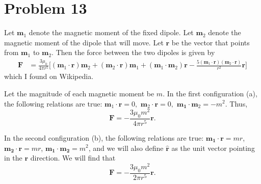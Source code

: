 \documentclass[12pt]{article}
\title{}
\date{}
\author{Jacob H. Nie}
\begin{document}
\section*{Problem 13}

Let $\mathbf{m}_1$ denote the magnetic moment of the fixed dipole.  Let $\mathbf{m}_2$ denote the magnetic moment of the dipole that will move.  Let $ \mathbf{r}$ be the vector that points from $\mathbf{m}_1$ to $\mathbf{m}_2$.  Then the force between the two dipoles is given by
\begin{align}
	\mathbf{F} &= \frac{3\mu_0}{4\pi r^{5}} \Big[ (\mathbf{m}_1 \cdot \mathbf{r})\mathbf{m}_2 + (\mathbf{m}_2 \cdot \mathbf{r})\mathbf{m}_1 + (\mathbf{m}_1\cdot \mathbf{m}_2)\mathbf{r} - \frac{5 (\mathbf{m}_1 \cdot \mathbf{r})(\mathbf{m}_2 \cdot \mathbf{r})}{r^2}\mathbf{r} \Big]
\end{align}
which I found on Wikipedia.  

Let the magnitude of each magnetic moment be $m$.  In the first configuration (a), the following relations are true: $\mathbf{m}_1 \cdot \mathbf{r} = 0,$ $\mathbf{m}_2 \cdot \mathbf{r} = 0,$ $\mathbf{m_1}\cdot \mathbf{m}_2 = -m^2$.  Thus,
\begin{equation}
	\mathbf{F} = -\frac{3\mu_0 m^2}{4\pi r^5} \mathbf{r}.
\end{equation}

In the second configuration (b), the following relations are true: $\mathbf{m_1}\cdot \mathbf{r} = mr$, $\mathbf{m_2}\cdot \mathbf{r} = mr$, $\mathbf{m_1}\cdot \mathbf{m_2} = m^2$, and we will also define $\hat{\mathbf{r}}$ as the unit vector pointing in the $\mathbf{r}$ direction.  We will find that
\begin{equation}
	\mathbf{F} = - \frac{3 \mu_0 m^2}{2\pi r^5} \mathbf{r}.
\end{equation}
\end{document}
